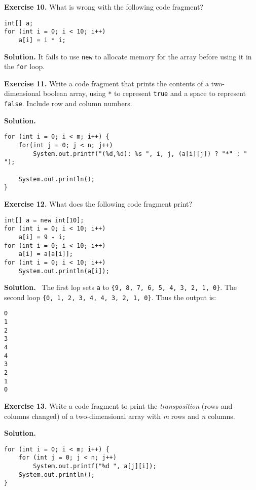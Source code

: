 \documentclass[12pt, a4paper]{article}
\newenvironment{ex}[2][Exercise]
{\par\medskip\noindent \textbf{#1 #2.}}
{\medskip}
\newenvironment{sol}[1][Solution]
{\par\medskip\noindent \textbf{#1.} }
{\medskip}
\begin{document}
	\begin{ex}{10}
		What is wrong with the following code fragment?
		\begin{lstlisting}
int[] a;
for (int i = 0; i < 10; i++)
	a[i] = i * i;
		\end{lstlisting}
	\end{ex}
	\begin{sol}
		It fails to use \texttt{new} to allocate memory for the array before using it in the
		\texttt{for} loop.
	\end{sol}
	\begin{ex}{11}
		Write a code fragment that prints the contents of a two-dimensional boolean array,
		using \texttt{*} to represent \texttt{true} and a space to represent \texttt{false}.
		Include row and column numbers.
	\end{ex}
	\begin{sol}
		\
		\begin{lstlisting}
for (int i = 0; i < m; i++) {
	for(int j = 0; j < n; j++)
		System.out.printf("(%d,%d): %s ", i, j, (a[i][j]) ? "*" : " ");
		
	System.out.println();
}
		\end{lstlisting}
	\end{sol}
	\begin{ex}{12}
		What does the following code fragment print?
		\begin{lstlisting}
int[] a = new int[10];
for (int i = 0; i < 10; i++)
	a[i] = 9 - i;
for (int i = 0; i < 10; i++)
	a[i] = a[a[i]];
for (int i = 0; i < 10; i++)
	System.out.println(a[i]);
		\end{lstlisting}
	\end{ex}
	\begin{sol}
		\
		The first lop sets \texttt{a}  to \texttt{\{9, 8, 7, 6, 5, 4, 3, 2, 1, 0\}}.
		The second loop \texttt{\{0, 1, 2, 3, 4, 4, 3, 2, 1, 0\}}. Thus the output is:
		\begin{lstlisting}
0
1
2
3
4
4
3
2
1
0
		\end{lstlisting}
	\end{sol}
	\begin{ex}{13}
		Write a code fragment to print the \emph{transposition} (rows and columns changed)
		of a two-dimensional array with \emph{m} rows and \emph{n} columns.
	\end{ex}
	\begin{sol}
		\
		\begin{lstlisting}
for (int i = 0; i < m; i++) {
	for (int j = 0; j < n; j++)
		System.out.printf("%d ", a[j][i]);
	System.out.println();
}
		\end{lstlisting}
	\end{sol}
\end{document}
